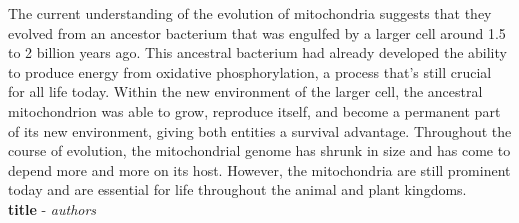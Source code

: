 \documentclass{article}
\begin{document}
The current understanding of the evolution of mitochondria suggests that they evolved from an ancestor bacterium that was engulfed by a larger cell around 1.5 to 2 billion years ago. This ancestral bacterium had already developed the ability to produce energy from oxidative phosphorylation, a process that’s still crucial for all life today. Within the new environment of the larger cell, the ancestral mitochondrion was able to grow, reproduce itself, and become a permanent part of its new environment, giving both entities a survival advantage. Throughout the course of evolution, the mitochondrial genome has shrunk in size and has come to depend more and more on its host. However, the mitochondria are still prominent today and are essential for life throughout the animal and plant kingdoms.\\
    \vspace{3mm}
        \textbf{title} - \textit{authors}\\
\end{document}
